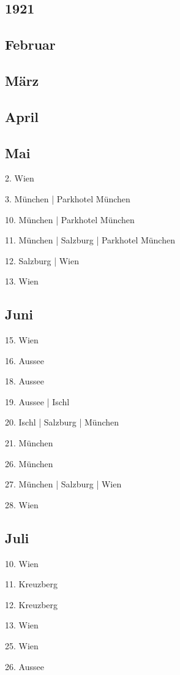 \documentclass[twoside=false,titlepage=false,open=any, parskip=never, fontsize=10pt, headings=small, chapterprefix=false, appendixprefix=false, DIV=15]{scrbook}
\begin{document}
\begin{multicols}{3}
            \chapter*{1921}
            \section*{Februar}
            \section*{März}
            \section*{April}
            \section*{Mai}
            2. Wien\par
            3. München | Parkhotel München\par
            10. München | Parkhotel München\par
            11. München | Salzburg | Parkhotel München\par
            12. Salzburg | Wien\par
            13. Wien\par
            \section*{Juni}
            15. Wien\par
            16. Aussee\par
            18. Aussee\par
            19. Aussee | Ischl\par
            20. Ischl | Salzburg | München\par
            21. München\par
            26. München\par
            27. München | Salzburg | Wien\par
            28. Wien\par
            \section*{Juli}
            10. Wien\par
            11. Kreuzberg\par
            12. Kreuzberg\par
            13. Wien\par
            25. Wien\par
            26. Aussee\par

\end{multicols}
\end{document}
